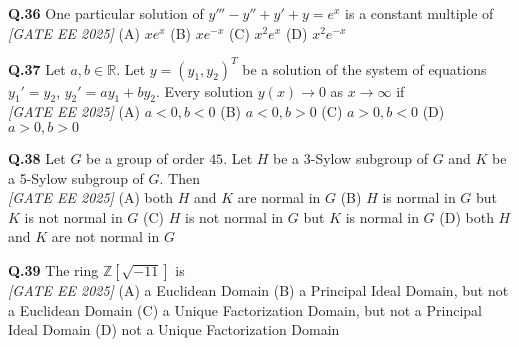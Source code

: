 \documentclass[11pt]{article}
\begin{document}
\begin{flushleft}
\textbf{Q.36} One particular solution of $y''' - y'' + y' + y = e^x$ is a constant multiple of
\\[1ex] \textit{[GATE EE 2025]}
\newline
(A) $x e^x$ \hspace{3em} (B) $x e^{-x}$ \hspace{3em} (C) $x^2 e^x$ \hspace{3em} (D) $x^2 e^{-x}$ \newline
\end{flushleft}

\begin{flushleft}
\textbf{Q.37} Let $a, b \in \mathbb{R}$. Let $y = (y_1, y_2)^T$ be a solution of the system of equations \newline
\hspace*{2em} $y_1' = y_2$, \quad $y_2' = a y_1 + b y_2$. \newline
Every solution $y(x) \to 0$ as $x \to \infty$ if
\\[1ex] \textit{[GATE EE 2025]}
\newline
(A) $a < 0, b < 0$ \hspace{2em} (B) $a < 0, b > 0$ \newline
(C) $a > 0, b < 0$ \hspace{2em} (D) $a > 0, b > 0$ \newline
\end{flushleft}

\begin{flushleft}
\textbf{Q.38} Let $G$ be a group of order $45$. Let $H$ be a 3-Sylow subgroup of $G$ and $K$ be a 5-Sylow subgroup of $G$. Then 
\\[1ex] \textit{[GATE EE 2025]}
\newline
(A) both $H$ and $K$ are normal in $G$ \newline
(B) $H$ is normal in $G$ but $K$ is not normal in $G$ \newline
(C) $H$ is not normal in $G$ but $K$ is normal in $G$ \newline
(D) both $H$ and $K$ are not normal in $G$ \newline
\end{flushleft}

\begin{flushleft}
\textbf{Q.39} The ring $\mathbb{Z}[\sqrt{-11}]$ is
\\[1ex] \textit{[GATE EE 2025]}
\newline
(A) a Euclidean Domain \newline
(B) a Principal Ideal Domain, but not a Euclidean Domain \newline
(C) a Unique Factorization Domain, but not a Principal Ideal Domain \newline
(D) not a Unique Factorization Domain \newline
\end{flushleft}
\end{document}
